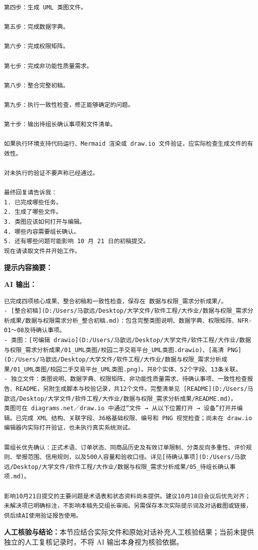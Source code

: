 \documentclass[heading=true,UTF8,a4paper,zihao=-4]{ctexart}
\begin{document}
\begin{QABox}
\begin{lstlisting}
第四步：生成 UML 类图文件。

第五步：完成数据字典。

第六步：完成权限矩阵。

第七步：完成非功能性质量需求。

第八步：整合完整初稿。

第九步：执行一致性检查，修正能够确定的问题。

第十步：输出待组长确认事项和文件清单。

如果执行环境支持代码运行、Mermaid 渲染或 draw.io 文件验证，应实际检查生成文件的有效性。

对未执行的验证不要声称已经通过。

最终回复请告诉我：
1. 已完成哪些任务。
2. 生成了哪些文件。
3. 类图应该如何打开与编辑。
4. 哪些内容需要组长确认。
5. 还有哪些问题可能影响 10 月 21 日的初稿提交。
现在请读取文件并开始工作。
\end{lstlisting}

\textbf{提示内容摘要：}

\textbf{AI 输出：}
\begin{lstlisting}
已完成四项核心成果、整合初稿和一致性检查，保存在 数据与权限_需求分析成果/。
- [整合初稿](D:/Users/马歆远/Desktop/大学文件/软件工程/大作业/数据与权限_需求分析成果/数据与权限需求分析_整合初稿.md)：包含完整类图说明、数据字典、权限矩阵、NFR-01～08及待确认事项。
- 类图：[可编辑 drawio](D:/Users/马歆远/Desktop/大学文件/软件工程/大作业/数据与权限_需求分析成果/01_UML类图/校园二手交易平台_UML类图.drawio)、[高清 PNG](D:/Users/马歆远/Desktop/大学文件/软件工程/大作业/数据与权限_需求分析成果/01_UML类图/校园二手交易平台_UML类图.png)。共8个实体、52个字段、13条关联。
- 独立文件：类图说明、数据字典、权限矩阵、非功能性质量需求、待确认事项、一致性检查报告、README，另附生成脚本与校验记录，共12个文件。完整清单见 [README](D:/Users/马歆远/Desktop/大学文件/软件工程/大作业/数据与权限_需求分析成果/README.md)。
类图可在 diagrams.net／draw.io 中通过“文件 → 从以下位置打开 → 设备”打开并编辑。已完成 XML 结构、关联字段、36格基础权限、编号和 PNG 视觉检查；尚未在 draw.io 编辑器内实际打开验证，也未执行真实系统测试。

需组长优先确认：正式术语、订单状态、同商品历史及有效订单限制、分类反向多重性、评价规则、举报范围、信用规则，以及500人容量和验收口径。详见[待确认事项](D:/Users/马歆远/Desktop/大学文件/软件工程/大作业/数据与权限_需求分析成果/05_待组长确认事项.md)。

影响10月21日提交的主要问题是术语表和状态资料尚未提供。建议10月18日会议后优先对齐；未解决项已明确标注，不影响本稿先交组长审阅。另需保存本次实际提示词及对话截图或链接，供后续AI使用验证报告使用。
\end{lstlisting}

\textbf{人工核验与结论：}本节应结合实际文件和原始对话补充人工核验结果；当前未提供独立的人工复核记录时，不将 AI 输出本身视为核验依据。
\end{QABox}
\end{document}
